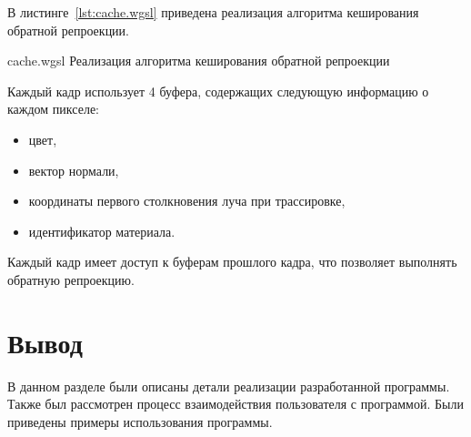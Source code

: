 В листинге~\ref{lst:cache.wgsl} приведена реализация алгоритма кеширования обратной репроекции.

    {cache.wgsl}
    {Реализация алгоритма кеширования обратной репроекции}

Каждый кадр использует 4 буфера, содержащих следующую информацию о каждом пикселе:
\begin{itemize}
    \item цвет,
    \item вектор нормали,
    \item координаты первого столкновения луча при трассировке,
    \item идентификатор материала.
\end{itemize}

Каждый кадр имеет доступ к буферам прошлого кадра, что позволяет выполнять обратную репроекцию.

\section*{Вывод}

В данном разделе были описаны детали реализации разработанной программы. 
Также был рассмотрен процесс взаимодействия пользователя с программой.
Были приведены примеры использования программы.
